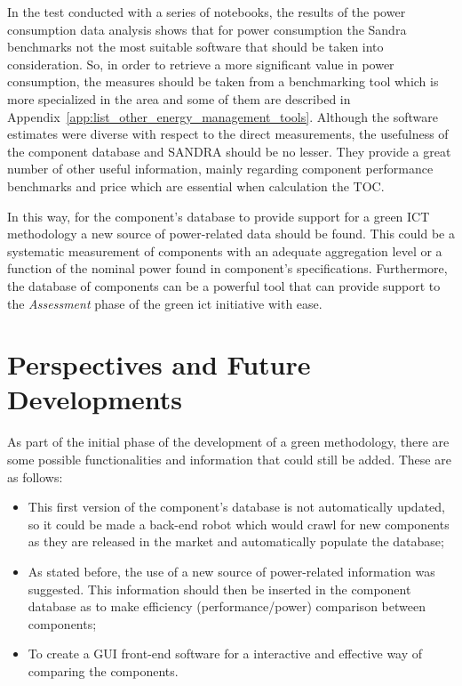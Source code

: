     In the test conducted with a series of notebooks, the results of the power consumption data analysis shows that for power consumption the Sandra benchmarks not the most suitable software that should be taken into consideration. So, in order to retrieve a more significant value in power consumption, the measures should be taken from a benchmarking tool which is more specialized in the area and some of them are described in Appendix~\ref{app:list_other_energy_management_tools}. Although the software estimates were diverse with respect to the direct measurements, the usefulness of the component database and SANDRA should be no lesser. They provide a great number of other useful information, mainly regarding component performance benchmarks and price which are essential when calculation the TOC. 
    
    In this way, for the component's database to provide support for a green ICT methodology a new source of power-related data should be found. This could be a systematic measurement of components with an adequate aggregation level or a function of the nominal power found in component's specifications. Furthermore, the database of components can be a powerful tool that can provide support to the \emph{Assessment} phase of the green ict initiative with ease.
    


    \pagebreak
    \section{Perspectives and Future Developments}

        As part of the initial phase of the development of a green methodology, there are some possible functionalities and information that could still be added. These are as follows:
    \begin{itemize}
	    \item This first version of the component's database is not automatically updated, so it could be made a back-end robot which would crawl for new components as they are released in the market and automatically populate the database;
	    \item As stated before, the use of a new source of power-related information was suggested. This information should then be inserted in the component database as to make efficiency (performance/power) comparison between components;
	    \item To create a GUI front-end software for a interactive and effective way of comparing the components.
    \end{itemize}







